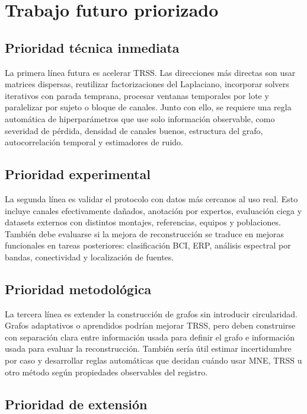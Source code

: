 \section{Trabajo futuro priorizado}

\subsection*{Prioridad técnica inmediata}

La primera línea futura es acelerar TRSS. Las direcciones más directas son usar matrices dispersas, reutilizar factorizaciones del Laplaciano, incorporar solvers iterativos con parada temprana, procesar ventanas temporales por lote y paralelizar por sujeto o bloque de canales. Junto con ello, se requiere una regla automática de hiperparámetros que use solo información observable, como severidad de pérdida, densidad de canales buenos, estructura del grafo, autocorrelación temporal y estimadores de ruido.

\subsection*{Prioridad experimental}

La segunda línea es validar el protocolo con datos más cercanos al uso real. Esto incluye canales efectivamente dañados, anotación por expertos, evaluación ciega y datasets externos con distintos montajes, referencias, equipos y poblaciones. También debe evaluarse si la mejora de reconstrucción se traduce en mejoras funcionales en tareas posteriores: clasificación BCI, ERP, análisis espectral por bandas, conectividad y localización de fuentes.

\subsection*{Prioridad metodológica}

La tercera línea es extender la construcción de grafos sin introducir circularidad. Grafos adaptativos o aprendidos podrían mejorar TRSS, pero deben construirse con separación clara entre información usada para definir el grafo e información usada para evaluar la reconstrucción. También sería útil estimar incertidumbre por caso y desarrollar reglas automáticas que decidan cuándo usar MNE, TRSS u otro método según propiedades observables del registro.

\subsection*{Prioridad de extensión}

